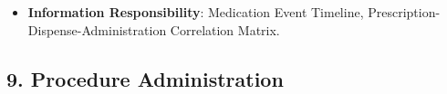 \begin{itemize}
\begin{itemize}
\begin{itemize}
\item
\emph{Exposed Service}: \texttt{} — Ingests pharmacy supply notifications.



\end{itemize}


\item
\textbf{Feature: Medication Administration Record (MAR) Ingestion}:


\begin{itemize}

\item
\emph{Function}: \texttt{} — Records medication administration-event information, including nurse-administered doses, e-MAR documentation and infusion telemetry as non-exhaustive examples; scope is not limited to nursing, bedside or inpatient settings.



\item
\emph{Exposed Service}: \texttt{} — Ingests administration records.



\end{itemize}


\end{itemize}


\item
\textbf{Information Responsibility}: Medication Event Timeline, Prescription-Dispense-Administration Correlation Matrix.



\end{itemize}
\label{rad:sa:146}

\par\smallskip
{}\label{rad:sa:148}
\subsection*{9. Procedure Administration}
\label{rad:sa:149}

